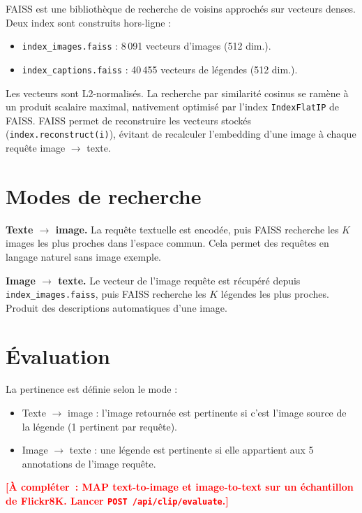 \documentclass[12pt,a4paper]{report}
\newcommand{\todo}[1]{\textcolor{red}{\textbf{[À compléter~: #1]}}}
\begin{document}
FAISS \cite{johnson2019} est une bibliothèque de recherche de voisins approchés sur vecteurs denses. Deux index sont construits hors-ligne :

\begin{itemize}
  \item \texttt{index\_images.faiss} : 8\,091 vecteurs d'images (512 dim.).
  \item \texttt{index\_captions.faiss} : 40\,455 vecteurs de légendes (512 dim.).
\end{itemize}

Les vecteurs sont L2-normalisés. La recherche par similarité cosinus se ramène à un produit scalaire maximal, nativement optimisé par l'index \texttt{IndexFlatIP} de FAISS. FAISS permet de reconstruire les vecteurs stockés (\texttt{index.reconstruct(i)}), évitant de recalculer l'embedding d'une image à chaque requête image $\to$ texte.

\section{Modes de recherche}

\textbf{Texte $\to$ image.} La requête textuelle est encodée, puis FAISS recherche les $K$ images les plus proches dans l'espace commun. Cela permet des requêtes en langage naturel sans image exemple.

\textbf{Image $\to$ texte.} Le vecteur de l'image requête est récupéré depuis \texttt{index\_images.faiss}, puis FAISS recherche les $K$ légendes les plus proches. Produit des descriptions automatiques d'une image.

\section{Évaluation}

La pertinence est définie selon le mode :
\begin{itemize}
  \item Texte $\to$ image : l'image retournée est pertinente si c'est l'image source de la légende (1 pertinent par requête).
  \item Image $\to$ texte : une légende est pertinente si elle appartient aux 5 annotations de l'image requête.
\end{itemize}

\todo{MAP text-to-image et image-to-text sur un échantillon de Flickr8K. Lancer \texttt{POST /api/clip/evaluate}.}

\end{document}
